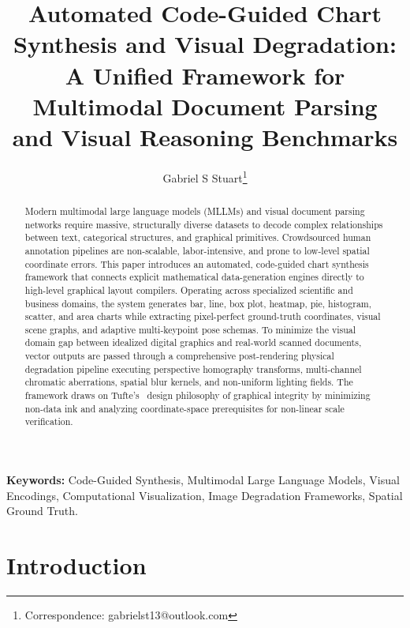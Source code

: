 \documentclass[11pt,twocolumn]{article}
\title{Automated Code-Guided Chart Synthesis and Visual Degradation:\\
A Unified Framework for Multimodal Document Parsing\\
and Visual Reasoning Benchmarks}
\author{
  Gabriel S Stuart\thanks{Correspondence: gabrielst13@outlook.com}
}
\date{}
\begin{document}
\maketitle

\begin{abstract}
Modern multimodal large language models (MLLMs) and visual document parsing networks require massive, 
structurally diverse datasets to decode complex relationships between text, categorical structures, and graphical primitives.
Crowdsourced human annotation pipelines are non-scalable, labor-intensive, and prone to low-level spatial coordinate errors.
This paper introduces an automated, code-guided chart synthesis framework that connects explicit mathematical data-generation engines directly to high-level graphical layout compilers.
Operating across specialized scientific and business domains, the system generates bar, line, box plot, heatmap, pie, histogram, scatter, and area charts while extracting pixel-perfect ground-truth coordinates, visual scene graphs, and adaptive multi-keypoint pose schemas.
To minimize the visual domain gap between idealized digital graphics and real-world scanned documents, vector outputs are passed through a comprehensive post-rendering physical degradation pipeline executing perspective homography transforms, multi-channel chromatic aberrations, spatial blur kernels, and non-uniform lighting fields.
The framework draws on Tufte's~\cite{tufte2001} design philosophy of graphical integrity by minimizing non-data ink and analyzing coordinate-space prerequisites for non-linear scale verification.
\end{abstract}

\smallskip
\noindent\textbf{Keywords:} Code-Guided Synthesis, Multimodal Large Language Models, Visual Encodings, Computational Visualization, Image Degradation Frameworks, Spatial Ground Truth.

\section{Introduction}\label{sec:intro}
\end{document}
